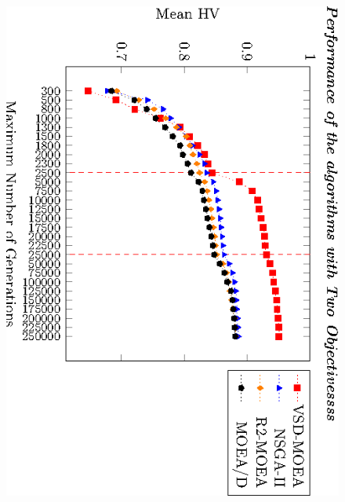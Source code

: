 \begin{figure}[t]
\centering
%
\includegraphics[angle=90,origin=c]{Images/Graphic-Performance-Time_tikz-figure0.eps} \\

\end{figure}
